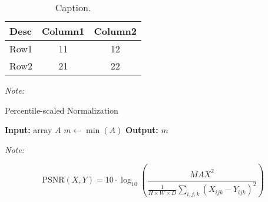 \begin{table}[p]
    \horgap{4.5pt}
    \caption{
        Caption.
    }
    \vspace{5pt}
    \label{tab:template_table}
    \centering
    \footnotesize 
    \begin{tabular}{lcc}
        \toprule
        Desc    & Column1   & Column2   \\
        \midrule
        Row1    & 11        & 12        \\
        Row2    & 21        & 22        \\
        \bottomrule
    \end{tabular}
    \vspace{5pt}
    \parbox{0.85\linewidth}{\footnotesize \textit{Note: }}
\end{table}


\begin{algorithm}[H]
    \caption{Percentile-scaled Normalization}
    \begin{algorithmic}[1]
        \STATE \textbf{Input:} array $A$
        \STATE $m \gets \min(A)$
        \STATE \textbf{Output:} $m$
    \end{algorithmic}
    \label{alg:template_algorithm}
    \vspace{0.5em}
    \small \textit{Note: }
\end{algorithm}


\begin{equation}
    \mathrm{PSNR}(X, Y) = 10 \cdot \log_{10} \left( \frac{MAX^2}{\frac{1}{H \times W \times D} \sum_{i,j,k} (X_{ijk} - Y_{ijk})^2} \right)
    \label{eq:template_equation}
\end{equation}
